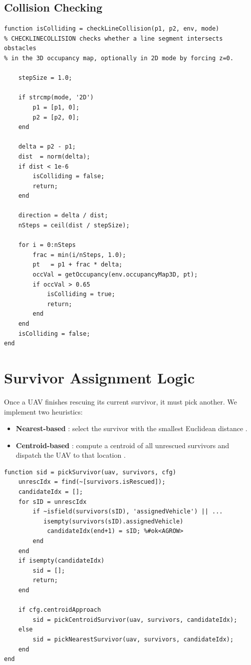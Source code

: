 \documentclass[12pt,a4paper]{report}
\begin{document}
\subsection{Collision Checking}
\label{sec:collision_checking}
\begin{verbatim}
function isColliding = checkLineCollision(p1, p2, env, mode)
% CHECKLINECOLLISION checks whether a line segment intersects obstacles
% in the 3D occupancy map, optionally in 2D mode by forcing z=0.

    stepSize = 1.0;

    if strcmp(mode, '2D')
        p1 = [p1, 0];
        p2 = [p2, 0];
    end

    delta = p2 - p1;
    dist  = norm(delta);
    if dist < 1e-6
        isColliding = false;
        return;
    end

    direction = delta / dist;
    nSteps = ceil(dist / stepSize);

    for i = 0:nSteps
        frac = min(i/nSteps, 1.0);
        pt   = p1 + frac * delta;
        occVal = getOccupancy(env.occupancyMap3D, pt);
        if occVal > 0.65
            isColliding = true;
            return;
        end
    end
    isColliding = false;
end
\end{verbatim}

\section{Survivor Assignment Logic}
\label{sec:assignment_logic}

Once a UAV finishes rescuing its current survivor, it must pick another. We implement
two heuristics:
\begin{itemize}
    \item \textbf{Nearest-based} : select the survivor with the smallest Euclidean
          distance \cite{Ghassemi2021NearestNeighbor}.
    \item \textbf{Centroid-based} : compute a centroid of all unrescued survivors
          and dispatch the UAV to that location \cite{Ho2016CentroidAssign}.
\end{itemize}

\begin{verbatim}
function sid = pickSurvivor(uav, survivors, cfg)
    unrescIdx = find(~[survivors.isRescued]);
    candidateIdx = [];
    for sID = unrescIdx
        if ~isfield(survivors(sID), 'assignedVehicle') || ...
           isempty(survivors(sID).assignedVehicle)
            candidateIdx(end+1) = sID; %#ok<AGROW>
        end
    end
    if isempty(candidateIdx)
        sid = [];
        return;
    end

    if cfg.centroidApproach
        sid = pickCentroidSurvivor(uav, survivors, candidateIdx);
    else
        sid = pickNearestSurvivor(uav, survivors, candidateIdx);
    end
end
\end{verbatim}
\end{document}
